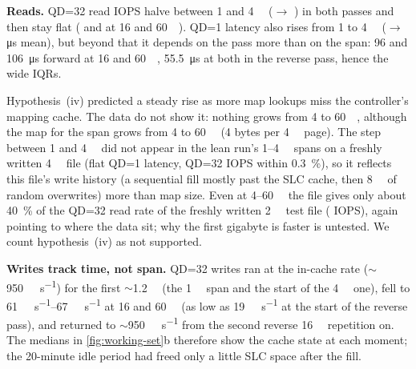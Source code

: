 \textbf{Reads.} QD=32 read IOPS halve between 1 and \qty{4}{\gibi\byte}
($\to$%
) in both passes and then stay flat
( and
 at 16 and \qty{60}{\gibi\byte}). QD=1
latency also rises from 1 to \qty{4}{\gibi\byte}
($\to$%
\,\si{\micro\second} mean), but
beyond that it depends on the pass more than on the span: \qty{96}{} and \qty{106}{\micro\second} forward at 16
and \qty{60}{\gibi\byte}, \qty{55.5}{\micro\second} at both in the reverse pass, hence the wide IQRs.

Hypothesis~(iv) predicted a steady rise as more map lookups miss the controller's mapping cache. The data
do not show it: nothing grows from 4 to \qty{60}{\gibi\byte}, although the map for the span grows from
\qty{4}{} to \qty{60}{\mebi\byte} (4 bytes per \qty{4}{\kibi\byte} page). The step between 1 and
\qty{4}{\gibi\byte} did not appear in the lean run's 1--\qty{4}{\gibi\byte} spans on a freshly written
\qty{4}{\gibi\byte} file (flat QD=1 latency, QD=32 IOPS within \qty{0.3}{\percent}), so it reflects this
file's write history (a sequential fill mostly past the SLC cache, then \qty{8}{\gibi\byte} of random
overwrites) more than map size. Even at 4--\qty{60}{\gibi\byte} the file gives only about
\qty{40}{\percent} of the QD=32 read rate of the freshly written \qty{2}{\gibi\byte} test file
( IOPS), again pointing to where the data sit; why the
first gigabyte is faster is untested. We count hypothesis~(iv) as not supported.

\textbf{Writes track time, not span.} QD=32 writes ran at the in-cache rate
(\ensuremath{\sim}\qty{950}{\mebi\byte\per\second}) for the first \ensuremath{\sim}\qty{1.2}{\gibi\byte}
(the \qty{1}{\gibi\byte} span and the start of the \qty{4}{\gibi\byte} one), fell to
\qtyrange{61}{67}{\mebi\byte\per\second} at 16 and \qty{60}{\gibi\byte} (as low as
\qty{19}{\mebi\byte\per\second} at the start of the reverse pass), and returned to
\ensuremath{\sim}\qty{950}{\mebi\byte\per\second} from the second reverse \qty{16}{\gibi\byte}
repetition on. The medians in \cref{fig:working-set}b therefore show the cache state at each moment;
the 20-minute idle period had freed only a little SLC space after the fill.

